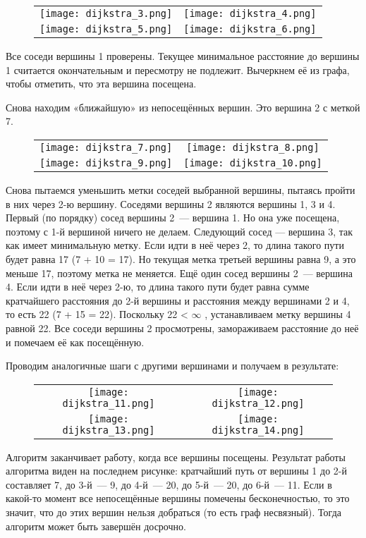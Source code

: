 \begin{figure}[!h]
    \centering 
    \begin{tabular}{cc}
        \texttt{[image: dijkstra\_3.png]} & \texttt{[image: dijkstra\_4.png]} \\
        \texttt{[image: dijkstra\_5.png]} & \texttt{[image: dijkstra\_6.png]}
    \end{tabular}
\end{figure}
\newpage
Все соседи вершины 1 проверены.
Текущее минимальное расстояние до вершины 1 считается окончательным и пересмотру не подлежит.
Вычеркнем её из графа, чтобы отметить, что эта вершина посещена. 

Снова находим «ближайшую» из непосещённых вершин. Это вершина 2 с меткой 7. 

\begin{figure}[!h]
    \centering 
    \begin{tabular}{cc}
        \texttt{[image: dijkstra\_7.png]} & \texttt{[image: dijkstra\_8.png]} \\
        \texttt{[image: dijkstra\_9.png]} & \texttt{[image: dijkstra\_10.png]}
    \end{tabular}
\end{figure}

Снова пытаемся уменьшить метки соседей выбранной вершины, пытаясь пройти в них через 2-ю вершину. Соседями вершины 2 являются вершины 1, 3 и 4.
Первый (по порядку) сосед вершины 2 — вершина 1. Но она уже посещена, поэтому с 1-й вершиной ничего не делаем.
Следующий сосед — вершина 3, так как имеет минимальную метку.
Если идти в неё через 2, то длина такого пути будет равна 17 (7 + 10 = 17). Но текущая метка третьей вершины равна 9, а это меньше 17, поэтому метка не меняется. 
Ещё один сосед вершины 2 — вершина 4.
Если идти в неё через 2-ю, то длина такого пути будет равна сумме кратчайшего расстояния до 2-й вершины и расстояния между вершинами 2 и 4, то есть 22 (7 + 15 = 22).
Поскольку 22 < $\infty$ , устанавливаем метку вершины 4 равной 22.
Все соседи вершины 2 просмотрены, замораживаем расстояние до неё и помечаем её как посещённую. 

Проводим аналогичные шаги с другими вершинами и получаем в результате:

\begin{figure}[!h]
    \centering 
    \begin{tabular}{cc}
        \texttt{[image: dijkstra\_11.png]} & \texttt{[image: dijkstra\_12.png]} \\
        \texttt{[image: dijkstra\_13.png]} & \texttt{[image: dijkstra\_14.png]}
    \end{tabular}
\end{figure}

Алгоритм заканчивает работу, когда все вершины посещены.
Результат работы алгоритма виден на последнем рисунке: кратчайший путь от вершины 1 до 2-й составляет 7, до 3-й — 9, до 4-й — 20, до 5-й — 20, до 6-й — 11.
Если в какой-то момент все непосещённые вершины помечены бесконечностью, то это значит, что до этих вершин нельзя добраться (то есть граф несвязный). Тогда алгоритм может быть завершён досрочно. 